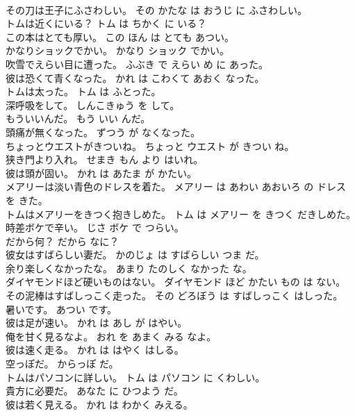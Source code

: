 \documentclass[8pt]{extreport}
\begin{document}
\begin{CJK}{UTF8}{min}
\\	その刀は王子にふさわしい。	その かたな は おうじ に ふさわしい。	
\\	トムは近くにいる？	トム は ちかく に いる？	
\\	この本はとても厚い。	この ほん は とても あつい。	
\\	かなりショックでかい。	かなり ショック でかい。	
\\	吹雪でえらい目に遭った。	ふぶき で えらい め に あった。	
\\	彼は恐くて青くなった。	かれ は こわくて あおく なった。	
\\	トムは太った。	トム は ふとった。	
\\	深呼吸をして。	しんこきゅう を して。	
\\	もういいんだ。	もう いい んだ。	
\\	頭痛が無くなった。	ずつう が なくなった。	
\\	ちょっとウエストがきついね。	ちょっと ウエスト が きつい ね。	
\\	狭き門より入れ。	せまき もん より はいれ。	
\\	彼は頭が固い。	かれ は あたま が かたい。	
\\	メアリーは淡い青色のドレスを着た。	メアリー は あわい あおいろ の ドレス を きた。	
\\	トムはメアリーをきつく抱きしめた。	トム は メアリー を きつく だきしめた。	
\\	時差ボケで辛い。	じさ ボケ で つらい。	
\\	だから何？	だから なに？	
\\	彼女はすばらしい妻だ。	かのじょ は すばらしい つま だ。	
\\	余り楽しくなかったな。	あまり たのしく なかった な。	
\\	ダイヤモンドほど硬いものはない。	ダイヤモンド ほど かたい もの は ない。	
\\	その泥棒はすばしっこく走った。	その どろぼう は すばしっこく はしった。	
\\	暑いです。	あつい です。	
\\	彼は足が速い。	かれ は あし が はやい。	
\\	俺を甘く見るなよ。	おれ を あまく みる なよ。	
\\	彼は速く走る。	かれ は はやく はしる。	
\\	空っぽだ。	からっぽ だ。	
\\	トムはパソコンに詳しい。	トム は パソコン に くわしい。	
\\	貴方に必要だ。	あなた に ひつよう だ。	
\\	彼は若く見える。	かれ は わかく みえる。	

\end{CJK}
\end{document}
